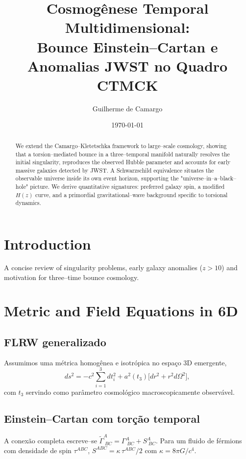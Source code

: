 \documentclass[aps,prd,reprint,amsmath,amssymb,nofootinbib]{revtex4-2}
\title{Cosmogênese Temporal Multidimensional:\\ Bounce Einstein--Cartan e Anomalias JWST no Quadro CTMCK}
\author{Guilherme de Camargo}
\affiliation{Independent Researcher, Londrina, Brazil}
\date{\today}
\begin{document}
\begin{abstract}
We extend the Camargo--Kletetschka framework to large--scale cosmology, showing that a torsion--mediated bounce in a three--temporal manifold naturally resolves the initial singularity, reproduces the observed Hubble parameter and accounts for early massive galaxies detected by JWST. A Schwarzschild equivalence situates the observable universe inside its own event horizon, supporting the "universe--in--a--black--hole" picture. We derive quantitative signatures: preferred galaxy spin, a modified $H(z)$ curve, and a primordial gravitational--wave background specific to torsional dynamics.
\end{abstract}
\maketitle

\section{Introduction}\label{sec:intro}
A concise review of singularity problems, early galaxy anomalies ($z>10$) and motivation for three--time bounce cosmology.

\section{Metric and Field Equations in 6D}\label{sec:metric}
\subsection{FLRW generalizado}
Assumimos uma métrica homogênea e isotrópica no espaço 3D emergente,
\begin{equation}
 ds^{2} = -c^{2}\sum_{i=1}^{3} dt_{i}^{2} + a^{2}(t_{3})\bigl[dr^{2}+r^{2}d\Omega^{2}\bigr],
 \end{equation}
com $t_{3}$ servindo como parâmetro cosmológico macroscopicamente observável.

\subsection{Einstein--Cartan com torção temporal}
A conexão completa escreve--se $\tilde{\Gamma}^{A}_{\;BC}=\Gamma^{A}_{\;BC}+S^{A}_{\;BC}$.
Para um fluido de férmions com densidade de spin $\tau^{ABC}$, $S^{ABC}=\kappa\,\tau^{ABC}/2$ com $\kappa=8\pi G/c^{4}$.
\end{document}
